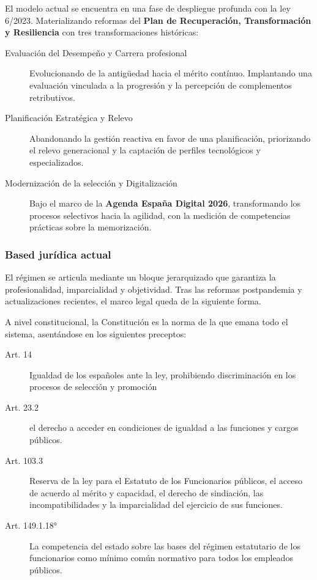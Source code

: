         El modelo actual se encuentra en una fase de despliegue profunda con la ley 6/2023. Materializando reformas del \textbf{Plan de Recuperación, Transformación y Resiliencia} con tres transformaciones históricas:
        \begin{description}
            \item[Evaluación del Desempeño y Carrera profesional] Evolucionando de la antigüedad hacia el mérito contínuo. Implantando una evaluación vinculada a la progresión y la percepción de complementos retributivos.
            \item[Planificación Estratégica y Relevo] Abandonando la gestión reactiva en favor de una planificación, priorizando el relevo generacional y la captación de perfiles tecnológicos y especializados.
            \item[Modernización de la selección y Digitalización] Bajo el marco de la \textbf{Agenda España Digital 2026}, transformando los procesos selectivos hacia la agilidad, con la medición de competencias prácticas sobre la memorización.
        \end{description}

    \subsubsection{Based jurídica actual} %
        El régimen se articula mediante un bloque jerarquizado que garantiza la profesionalidad, imparcialidad y objetividad. Tras las reformas postpandemia y actualizaciones recientes, el marco legal queda de la siguiente forma.

        A nivel constitucional, la Constitución es la norma de la que emana todo el sistema, asentándose en los siguientes preceptos:
        \begin{description}
            \item[Art. 14] Igualdad de los españoles ante la ley, prohibiendo discriminación en los procesos de selección y promoción
            \item[Art. 23.2] el derecho a acceder en condiciones de igualdad a las funciones y cargos públicos.
            \item[Art. 103.3] Reserva de la ley para el Estatuto de los Funcionarios públicos, el acceso de acuerdo al mérito y capacidad, el derecho de sindiación, las incompatibilidades y la imparcialidad del ejercicio de sus funciones.
            \item[Art. 149.1.18°] La competencia del estado sobre las bases del régimen estatutario de los funcionarios como mínimo común normativo para todos los empleados públicos.
        \end{description}


